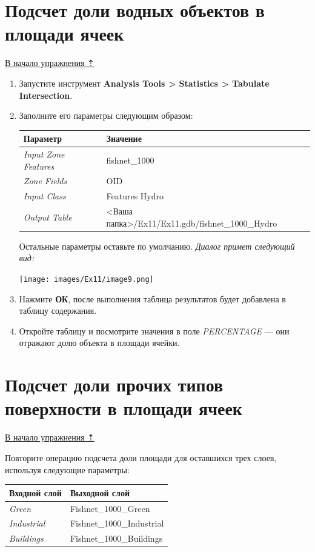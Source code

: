 \documentclass[12pt,]{book}
\begin{document}
\hypertarget{land-cover-hydro-waters}{%
\section{Подсчет доли водных объектов в площади ячеек}\label{land-cover-hydro-waters}}

\protect\hyperlink{land-cover-hydro}{В начало упражнения ⇡}

\begin{enumerate}
\def\labelenumi{\arabic{enumi}.}
\item
  Запустите инструмент \textbf{Analysis Tools \textgreater{} Statistics \textgreater{} Tabulate Intersection}.
\item
  Заполните его параметры следующим образом:

  \begin{longtable}[]{@{}ll@{}}
  \toprule
  Параметр & Значение\tabularnewline
  \midrule
  \endhead
  \emph{Input Zone Features} & fishnet\_1000\tabularnewline
  \emph{Zone Fields} & OID\tabularnewline
  \emph{Input Class} & Features Hydro\tabularnewline
  \emph{Output Table} & \textless Ваша папка\textgreater/Ex11/Ex11.gdb/fishnet\_1000\_Hydro\tabularnewline
  \bottomrule
  \end{longtable}

  Остальные параметры оставьте по умолчанию. \emph{Диалог примет следующий вид:}

  \texttt{[image: images/Ex11/image9.png]}
\item
  Нажмите \textbf{ОК}, после выполнения таблица результатов будет добавлена в таблицу содержания.
\item
  Откройте таблицу и посмотрите значения в поле \emph{PERCENTAGE} --- они отражают долю объекта в площади ячейки.
\end{enumerate}

\hypertarget{land-cover-hydro-others}{%
\section{Подсчет доли прочих типов поверхности в площади ячеек}\label{land-cover-hydro-others}}

\protect\hyperlink{land-cover-hydro}{В начало упражнения ⇡}

Повторите операцию подсчета доли площади для оставшихся трех слоев, используя следующие параметры:

\begin{longtable}[]{@{}ll@{}}
\toprule
Входной слой & Выходной слой\tabularnewline
\midrule
\endhead
\emph{Green} & Fishnet\_1000\_Green\tabularnewline
\emph{Industrial} & Fishnet\_1000\_Industrial\tabularnewline
\emph{Buildings} & Fishnet\_1000\_Buildings\tabularnewline
\bottomrule
\end{longtable}
\end{document}
